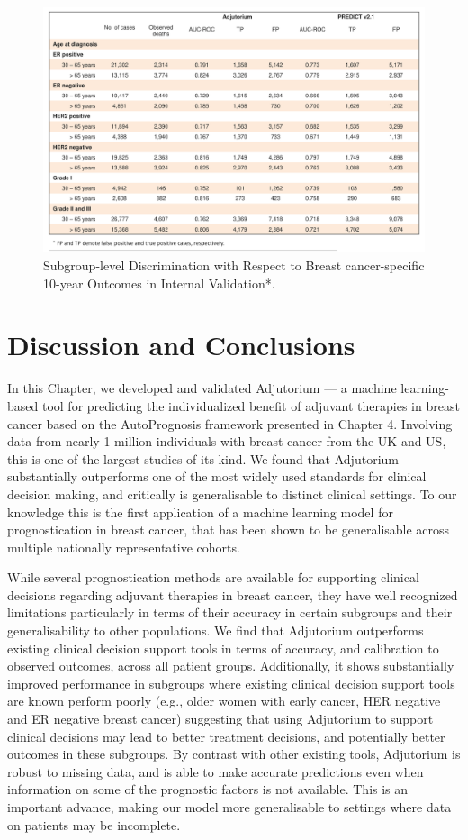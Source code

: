 \documentclass [PhD] {uclathes}
\begin{document}
\afterpage{\clearpage}
\begin{figure}
\centering
   \includegraphics[width=9in]{ch8Table3.pdf}
    \caption{Subgroup-level Discrimination with Respect to Breast cancer-specific 10-year Outcomes in Internal Validation*.}
    \label{ch8Table3}
\end{figure}

\section{Discussion and Conclusions}
In this Chapter, we developed and validated Adjutorium --- a machine learning-based tool for predicting the individualized benefit of adjuvant therapies in breast cancer based on the AutoPrognosis framework presented in Chapter 4. Involving data from nearly 1 million individuals with breast cancer from the UK and US, this is one of the largest studies of its kind. We found that Adjutorium substantially outperforms one of the most widely used standards for clinical decision making, and critically is generalisable to distinct clinical settings. To our knowledge this is the first application of a machine learning model for prognostication in breast cancer, that has been shown to be generalisable across multiple nationally representative cohorts. 


While several prognostication methods are available for supporting clinical decisions regarding adjuvant therapies in breast cancer, they have well recognized limitations particularly in terms of their accuracy in certain subgroups and their generalisability to other populations. We find that Adjutorium outperforms existing clinical decision support tools in terms of accuracy, and calibration to observed outcomes, across all patient groups. Additionally, it shows substantially improved performance in subgroups where existing clinical decision support tools are known perform poorly (e.g., older women with early cancer, HER negative and ER negative breast cancer) suggesting that using Adjutorium to support clinical decisions may lead to better treatment decisions, and potentially better outcomes in these subgroups. By contrast with other existing tools, Adjutorium is robust to missing data, and is able to make accurate predictions even when information on some of the prognostic factors is not available. This is an important advance, making our model more generalisable to settings where data on patients may be incomplete. 
\end{document}
